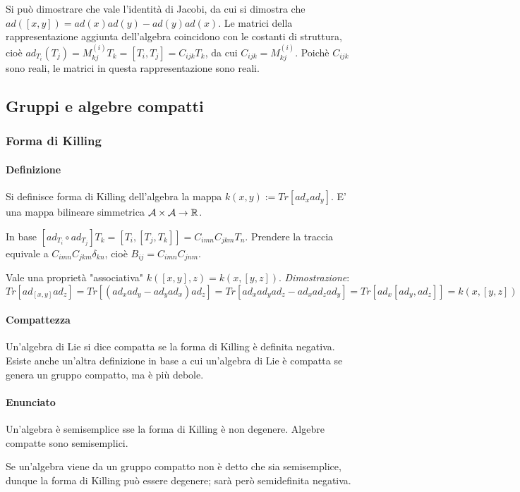 \documentclass[12pt,oneside,notitlepage,abstracton,a4paper]{scrartcl}
\newcommand{\A}{\mathcal{A}}
\begin{document}
Si può dimostrare che vale l'identità di Jacobi, da cui si dimostra che $ad([x,y]) = ad(x)ad(y)-ad(y)ad(x)$. Le matrici della rappresentazione aggiunta dell'algebra coincidono con le costanti di struttura, cioè $ad_{T_i}(T_j) = M^{(i)}_{kj} T_k = [T_i,T_j] = C_{ijk} T_k$, da cui $C_{ijk} = M^{(i)}_{kj}$. Poichè $C_{ijk}$ sono reali, le matrici in questa rappresentazione sono reali.

\subsection{Gruppi e algebre compatti}
\subsubsection{Forma di Killing}
\paragraph{Definizione} Si definisce forma di Killing dell'algebra la mappa $k(x,y) := Tr[ad_x ad_y]$. E' una mappa bilineare simmetrica $\A \times \A \rightarrow \R$.

In base $[ad_{T_i} \circ ad_{T_j}]T_k = [T_i, [T_j, T_k]] = C_{imn} C_{jkm} T_n$. Prendere la traccia equivale a $C_{imn} C_{jkm} \delta_{kn}$, cioè $B_{ij} = C_{imn} C_{jnm}$.

Vale una proprietà "associativa" $k([x,y], z) = k(x, [y,z])$. \emph{Dimostrazione}: $Tr[ad_{[x,y]} ad_z] = Tr[(ad_xad_y-ad_yad_x)ad_z] = Tr[ad_xad_yad_z - ad_xad_zad_y] = Tr[ad_x [ad_y,ad_z]] = k(x, [y,z])$

\paragraph{Compattezza} Un'algebra di Lie si dice compatta se la forma di Killing è definita negativa. Esiste anche un'altra definizione in base a cui un'algebra di Lie è compatta se genera un gruppo compatto, ma è più debole.

\paragraph{Enunciato} Un'algebra è semisemplice sse la forma di Killing è non degenere. Algebre compatte sono semisemplici.

Se un'algebra viene da un gruppo compatto non è detto che sia semisemplice, dunque la forma di Killing può essere degenere; sarà però semidefinita negativa.
\end{document}
